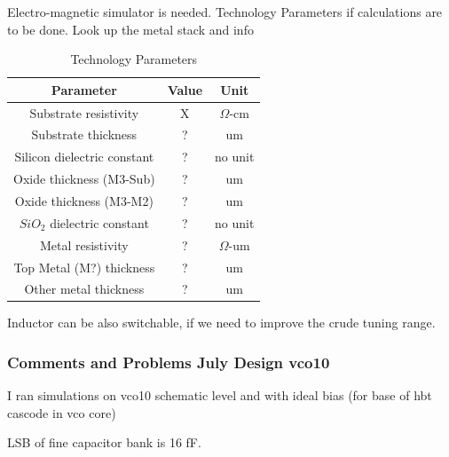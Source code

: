 Electro-magnetic simulator is needed. Technology Parameters if calculations are to be done. Look up the metal stack and info %

\begin{table}[ht]
	\centering
	\begin{tabular}{|c|c|c|}
		\hline
		\rowcolor{LightCyan}
		Parameter & Value & Unit \\
		\hline
		Substrate resistivity & X & $\Omega$-\unit{cm}\\
		\hline
		Substrate thickness & ? & \unit{um} \\
		\hline
		Silicon dielectric constant & ? & no unit \\
		\hline
		Oxide thickness (M3-Sub) & ? &  \unit{um} \\
		\hline
		Oxide thickness (M3-M2) & ? &  \unit{um} \\
		\hline
		$SiO_2$ dielectric constant & ? & no unit \\
		\hline
		Metal resistivity & ? & $\Omega$-\unit{um} \\
		\hline
		Top Metal (M?) thickness & ? &  \unit{um} \\
		\hline
		Other metal thickness& ? &  \unit{um} \\
		\hline
	\end{tabular}
	\label{tech-param}
	\caption{Technology Parameters} 

\end{table}

Inductor can be also switchable, if we need to improve the crude tuning range.

\subsubsection{Comments and Problems July Design vco10}

I ran simulations on vco10 schematic level and with ideal bias (for base of hbt cascode in vco core)

LSB of fine capacitor bank is 16 fF. 


